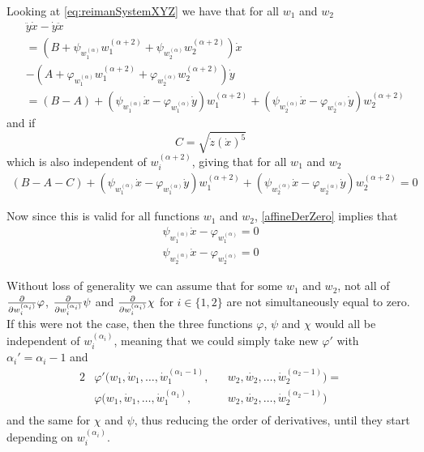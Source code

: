 \documentclass[12pt]{article}
\begin{document}
\begin{lemma}[ $\psi_{w_i^{(\alpha)}}\dot{x} - \varphi_{w_i^{(\alpha)}}\dot{y} =
  0$ ]
  Looking at \eqref{eq:reimanSystemXYZ} we have that for all $w_1$ and $w_2$
  \begin{align*}
    &\ddot{y}\dot{x} - \dot{y}\ddot{x} \\
    &=  ( B + \psi_{w_1^{(\alpha)}} w_1^{(\alpha+2)} 
    + \psi_{w_2^{(\alpha)}} w_2^{(\alpha+2)} ) \dot{x} \\
    &- ( A + \varphi_{w_1^{(\alpha)}} w_1^{(\alpha+2)} 
    + \varphi_{w_2^{(\alpha)}} w_2^{(\alpha+2)} ) \dot{y} \\
    & = (B - A)
    + (\psi_{w_1^{(\alpha)}}\dot{x} - \varphi_{w_1^{(\alpha)}} \dot{y} ) w_1^{(\alpha+2)}
    + (\psi_{w_2^{(\alpha)}}\dot{x} - \varphi_{w_2^{(\alpha)}} \dot{y} ) w_2^{(\alpha+2)}
  \end{align*}
  and if 
  \[ C = \sqrt{\dot{z}(\dot{x})^5} \]
  which is also independent of $w_i^{(\alpha + 2)}$, giving that for all $w_1$ and $w_2$
  \begin{align*}
    (B - A - C)
    + (\psi_{w_1^{(\alpha)}}\dot{x} - \varphi_{w_1^{(\alpha)}} \dot{y} ) w_1^{(\alpha+2)}
    + (\psi_{w_2^{(\alpha)}}\dot{x} - \varphi_{w_2^{(\alpha)}} \dot{y} ) w_2^{(\alpha+2)}
    = 0
  \end{align*}
  
  Now since this is valid for all functions $w_1$ and $w_2$, \ref{affineDerZero}
  implies that
  \begin{align*}
    \psi_{w_1^{(\alpha)}}\dot{x} - \varphi_{w_1^{(\alpha)}} = 0 \\
    \psi_{w_2^{(\alpha)}}\dot{x} - \varphi_{w_2^{(\alpha)}} = 0
  \end{align*}
  
\end{lemma}

\begin{lemma} \label{lastDerNeqZero}
  Without loss of generality we can assume that for some $w_1$ and $w_2$, not all
  of $\frac{\partial }{\partial w_i^{(\alpha_i)} } \varphi$, $\frac{\partial }{\partial w_i^{(\alpha_i)} } \psi$ and
  $\frac{\partial }{\partial w_i^{(\alpha_i)} } \chi$ for $i \in \{1,2\}$ are not simultaneously equal to zero.
  If this were not the case, then the three functions $\varphi$, $\psi$ and $\chi$
  would all be independent of $w_i^{(\alpha_i)}$, meaning that we could simply take
  new $\varphi'$ with $\alpha_i' = \alpha_i - 1$ and
  \begin{alignat*}{2}
    &\varphi'(w_1, \dot{w}_1, \ldots, \dot{w}_1^{(\alpha_1-1)}, && w_2, \dot{w_2},
    \ldots, \dot{w}_2^{(\alpha_2-1)} ) = \\
    &\varphi(w_1, \dot{w}_1, \ldots, \dot{w}_1^{(\alpha_1)}, && w_2, \dot{w_2},
    \ldots, \dot{w}_2^{(\alpha_2-1)} ) \\
  \end{alignat*}  
  and the same for $\chi$ and $\psi$, thus reducing the order of derivatives,
  until they start depending on $w_i^{(\alpha_i)}$.
\end{lemma}
\end{document}
